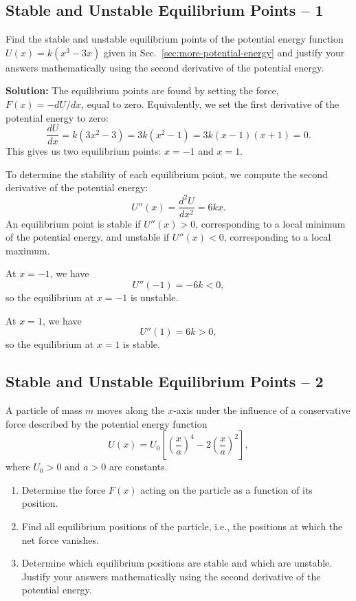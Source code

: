 \documentclass[../main.tex]{subfiles}
\begin{document}
\subsection{Stable and Unstable Equilibrium Points -- 1}
Find the stable and unstable equilibrium points of the potential energy function $U(x) = k(x^3-3x)$ given in Sec.~\ref{sec:more-potential-energy} and justify your answers mathematically using the second derivative of the potential energy.

\textbf{Solution:} The equilibrium points are found by setting the force, $F(x)=-dU/dx$, equal to zero. Equivalently, we set the first derivative of the potential energy to zero:
\begin{equation}
    \frac{dU}{dx} = k(3x^2-3)
    = 3k(x^2-1)
    = 3k(x-1)(x+1) = 0.
\end{equation}
This gives us two equilibrium points: $x=-1$ and $x=1$.

To determine the stability of each equilibrium point, we compute the second derivative of the potential energy:
\begin{equation}
    U''(x) = \frac{d^2U}{dx^2} = 6kx.
\end{equation}
An equilibrium point is stable if $U''(x)>0$, corresponding to a local minimum of the potential energy, and unstable if $U''(x)<0$, corresponding to a local maximum.

At $x=-1$, we have
\begin{equation}
    U''(-1)=-6k<0,
\end{equation}
so the equilibrium at $x=-1$ is unstable.

At $x=1$, we have
\begin{equation}
    U''(1)=6k>0,
\end{equation}
so the equilibrium at $x=1$ is stable.

\subsection{Stable and Unstable Equilibrium Points -- 2}

A particle of mass $m$ moves along the $x$-axis under the influence of a conservative force described by the potential energy function
\begin{equation}
    U(x) = U_0 \left[\left(\frac{x}{a}\right)^4 - 2\left(\frac{x}{a}\right)^2\right],
\end{equation}
where $U_0>0$ and $a>0$ are constants.

\begin{enumerate}
    \item[(a)] Determine the force $F(x)$ acting on the particle as a function of its position.

    \item[(b)] Find all equilibrium positions of the particle, i.e., the positions at which the net force vanishes.

    \item[(c)] Determine which equilibrium positions are stable and which are unstable. Justify your answers mathematically using the second derivative of the potential energy.
\end{enumerate}
\end{document}
